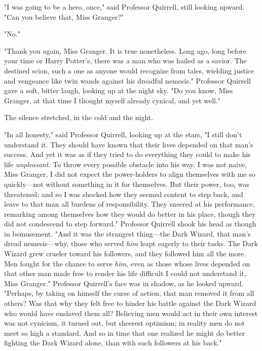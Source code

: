 "I was going to be a hero, once," said Professor Quirrell, still looking
upward. "Can you believe that, Miss Granger?"

"No."

"Thank you again, Miss Granger. It is true nonetheless. Long ago, long before
your time or Harry Potter's, there was a man who was hailed as a savior. The
destined scion, such a one as anyone would recognize from tales, wielding
justice and vengeance like twin wands against his dreadful nemesis." Professor
Quirrell gave a soft, bitter laugh, looking up at the night sky. "Do you know,
Miss Granger, at that time I thought myself already cynical, and yet{\el}
well."

The silence stretched, in the cold and the night.

"In all honesty," said Professor Quirrell, looking up at the stars, "I still
don't understand it. They should have known that their lives depended on that
man's success. And yet it was as if they tried to do everything they could to
make his life \emph{unpleasant.} To throw every possible obstacle into his way.
I was not naive, Miss Granger, I did not expect the power-holders to align
themselves with me so quickly---not without something in it for themselves. But
their power, too, was threatened; and so I was shocked how they seemed content
to step back, and leave to that man all burdens of responsibility. They sneered
at his performance, remarking among themselves how they would do better in his
place, though they did not condescend to step forward." Professor Quirrell
shook his head as though in bemusement. "And it was the strangest thing---the
Dark Wizard, that man's dread nemesis---why, those who served \emph{him} leapt
eagerly to their tasks. The Dark Wizard grew crueler toward his followers, and
they followed him all the more. Men fought for the chance to serve \emph{him},
even as those whose lives depended on that other man made free to render his
life difficult{\el} I could not understand it, Miss Granger." Professor
Quirrell's face was in shadow, as he looked upward. "Perhaps, by taking on
himself the curse of action, that man removed it from all others? Was that why
they felt free to hinder his battle against the Dark Wizard who would have
enslaved them all? Believing men would act in their own interest was not
cynicism, it turned out, but sheerest optimism; in reality men do not meet so
high a standard. And so in time that one realized he might do better fighting
the Dark Wizard alone, than with such followers at his back."

